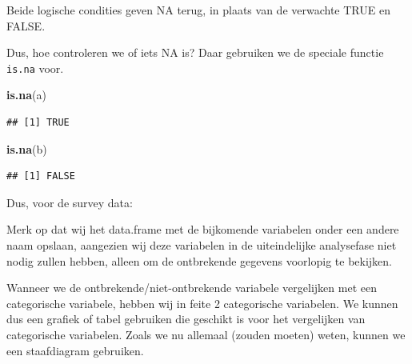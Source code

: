 \documentclass[]{tufte-book}
\newenvironment{Shaded}{}{}
\newcommand{\DataTypeTok}[1]{\textcolor[rgb]{0.56,0.13,0.00}{#1}}
\newcommand{\KeywordTok}[1]{\textcolor[rgb]{0.00,0.44,0.13}{\textbf{#1}}}
\newcommand{\NormalTok}[1]{#1}
\newcommand{\OperatorTok}[1]{\textcolor[rgb]{0.40,0.40,0.40}{#1}}
\newcommand{\StringTok}[1]{\textcolor[rgb]{0.25,0.44,0.63}{#1}}
\begin{document}
Beide logische condities geven NA terug, in plaats van de verwachte TRUE en FALSE.

Dus, hoe controleren we of iets NA is? Daar gebruiken we de speciale functie \texttt{is.na} voor.

\begin{Shaded}
\begin{Highlighting}[]
\KeywordTok{is.na}\NormalTok{(a)}
\end{Highlighting}
\end{Shaded}

\begin{verbatim}
## [1] TRUE
\end{verbatim}

\begin{Shaded}
\begin{Highlighting}[]
\KeywordTok{is.na}\NormalTok{(b)}
\end{Highlighting}
\end{Shaded}

\begin{verbatim}
## [1] FALSE
\end{verbatim}

Dus, voor de survey data:

\begin{Shaded}
\end{Shaded}

Merk op dat wij het data.frame met de bijkomende variabelen onder een andere naam opslaan, aangezien wij deze variabelen in de uiteindelijke analysefase niet nodig zullen hebben, alleen om de ontbrekende gegevens voorlopig te bekijken.

Wanneer we de ontbrekende/niet-ontbrekende variabele vergelijken met een categorische variabele, hebben wij in feite 2 categorische variabelen. We kunnen dus een grafiek of tabel gebruiken die geschikt is voor het vergelijken van categorische variabelen. Zoals we nu allemaal (zouden moeten) weten, kunnen we een staafdiagram gebruiken.

\begin{Shaded}
\end{Shaded}
\end{document}

